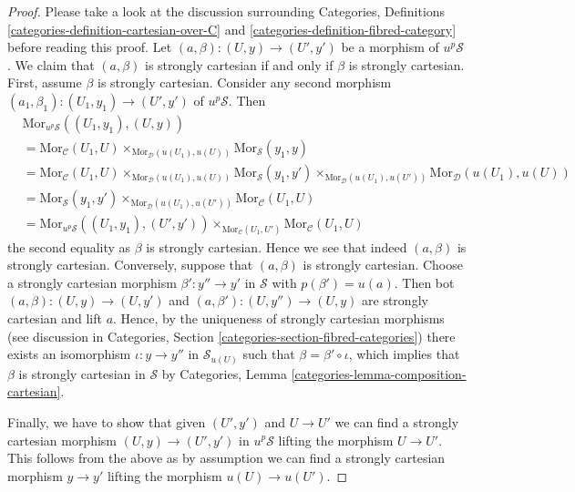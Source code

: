 \begin{proof}
Please take a look at the discussion surrounding
Categories, Definitions \ref{categories-definition-cartesian-over-C} and
\ref{categories-definition-fibred-category}
before reading this proof.
Let $(a, \beta) : (U, y) \to (U', y')$ be a morphism of $u^p\mathcal{S}$.
We claim that $(a, \beta)$ is strongly cartesian if and only if
$\beta$ is strongly cartesian. First, assume $\beta$ is strongly cartesian.
Consider any second morphism
$(a_1, \beta_1) : (U_1, y_1) \to (U', y')$ of $u^p\mathcal{S}$.
Then
\begin{align*}
& \text{Mor}_{u^p\mathcal{S}}((U_1, y_1), (U, y)) \\
& =
\text{Mor}_{\mathcal{C}}(U_1, U)
\times_{\text{Mor}_{\mathcal{D}}(u(U_1), u(U))}
\text{Mor}_{\mathcal{S}}(y_1, y) \\
& =
\text{Mor}_{\mathcal{C}}(U_1, U)
\times_{\text{Mor}_{\mathcal{D}}(u(U_1), u(U))}
\text{Mor}_{\mathcal{S}}(y_1, y')
\times_{\text{Mor}_{\mathcal{D}}(u(U_1), u(U'))}
\text{Mor}_{\mathcal{D}}(u(U_1), u(U)) \\
& =
\text{Mor}_{\mathcal{S}}(y_1, y')
\times_{\text{Mor}_{\mathcal{D}}(u(U_1), u(U'))}
\text{Mor}_{\mathcal{C}}(U_1, U) \\
& = 
\text{Mor}_{u^p\mathcal{S}}((U_1, y_1), (U', y'))
\times_{\text{Mor}_{\mathcal{C}}(U_1, U')}
\text{Mor}_{\mathcal{C}}(U_1, U)
\end{align*}
the second equality as $\beta$ is strongly cartesian. Hence we see that
indeed $(a, \beta)$ is strongly cartesian. Conversely, suppose that
$(a, \beta)$ is strongly cartesian. Choose a strongly cartesian morphism
$\beta' : y'' \to y'$ in $\mathcal{S}$ with $p(\beta') = u(a)$.
Then bot $(a, \beta) : (U, y) \to (U, y')$ and
$(a, \beta') : (U, y'') \to (U, y)$ are strongly cartesian and
lift $a$. Hence, by the uniqueness of strongly cartesian morphisms
(see discussion in
Categories, Section \ref{categories-section-fibred-categories})
there exists an isomorphism $\iota : y \to y''$ in $\mathcal{S}_{u(U)}$
such that $\beta = \beta' \circ \iota$, which implies that
$\beta$ is strongly cartesian in $\mathcal{S}$ by
Categories, Lemma \ref{categories-lemma-composition-cartesian}.

\medskip\noindent
Finally, we have to show
that given $(U', y')$ and $U \to U'$ we can find a strongly
cartesian morphism $(U, y) \to (U', y')$ in $u^p\mathcal{S}$
lifting the morphism $U \to U'$. This follows from the above as by assumption
we can find a strongly cartesian morphism $y \to y'$ lifting the
morphism $u(U) \to u(U')$.
\end{proof}

